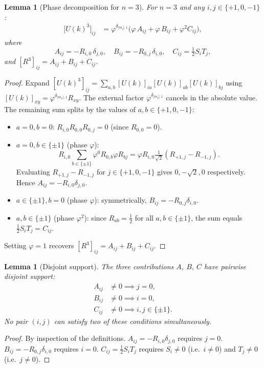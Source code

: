 \documentclass[12pt,a4paper]{article}
\newtheorem{lemma}[theorem]{Lemma}
\begin{document}
\begin{lemma}[Phase decomposition for $n=3$]
\label{lem:phase_decomp}
For $n=3$ and any $i,j\in\{+1,0,-1\}$:
\begin{align}
\bigl[U(k)^3\bigr]_{ij}
&= \varphi^{\delta_{|m_i|,1}}\bigl(\varphi\,A_{ij} + \varphi\,B_{ij}
   +\varphi^2 C_{ij}\bigr),\label{eq:Uk3}
\end{align}
where
\[
  A_{ij} = -R_{i,0}\,\delta_{j,0},\quad
  B_{ij} = -R_{0,j}\,\delta_{i,0},\quad
  C_{ij} = \tfrac12 S_i T_j,
\]
and $[R^3]_{ij} = A_{ij}+B_{ij}+C_{ij}$.
\end{lemma}
\begin{proof}
Expand $[U(k)^3]_{ij} = \sum_{a,b}[U(k)]_{ia}[U(k)]_{ab}[U(k)]_{bj}$
using $[U(k)]_{xy} = \varphi^{\delta_{|m_x|,1}}R_{xy}$.  The
external factor $\varphi^{\delta_{|m_i|,1}}$ cancels in the absolute
value.  The remaining sum splits by the values of $a,b\in\{+1,0,-1\}$:
\begin{itemize}
\item $a=0,b=0$: $R_{i,0}R_{0,0}R_{0,j}=0$ (since $R_{0,0}=0$).
\item $a=0,b\in\{\pm1\}$ (phase $\varphi$):
\[
  \textstyle R_{i,0}\sum_{b\in\{\pm1\}}\varphi^0 R_{0,b}\varphi R_{bj}
  = \varphi R_{i,0}\tfrac{1}{\sqrt{2}}(R_{+1,j}-R_{-1,j}).
\]
Evaluating $R_{+1,j}-R_{-1,j}$ for $j\in\{+1,0,-1\}$ gives $0,-\sqrt{2},0$
respectively.  Hence $A_{ij}=-R_{i,0}\delta_{j,0}$. \checkmark
\item $a\in\{\pm1\},b=0$ (phase $\varphi$): symmetrically, $B_{ij}=-R_{0,j}\delta_{i,0}$.
\item $a,b\in\{\pm1\}$ (phase $\varphi^2$): since $R_{ab}=\tfrac12$ for all
  $a,b\in\{\pm1\}$, the sum equals $\tfrac12 S_i T_j=C_{ij}$.
\end{itemize}
Setting $\varphi=1$ recovers $[R^3]_{ij}=A_{ij}+B_{ij}+C_{ij}$.
\end{proof}

\begin{lemma}[Disjoint support]
\label{lem:disjoint}
The three contributions $A$, $B$, $C$ have pairwise disjoint support:
\begin{align*}
  A_{ij}&\neq 0 \implies j=0,\\
  B_{ij}&\neq 0 \implies i=0,\\
  C_{ij}&\neq 0 \implies i,j\in\{\pm1\}.
\end{align*}
No pair $(i,j)$ can satisfy two of these conditions simultaneously.
\end{lemma}
\begin{proof}
By inspection of the definitions.  $A_{ij}=-R_{i,0}\delta_{j,0}$ requires $j=0$.
$B_{ij}=-R_{0,j}\delta_{i,0}$ requires $i=0$.
$C_{ij}=\tfrac12 S_i T_j$ requires $S_i\neq 0$ (i.e.\ $i\neq 0$)
and $T_j\neq 0$ (i.e.\ $j\neq 0$).
\end{proof}
\end{document}
